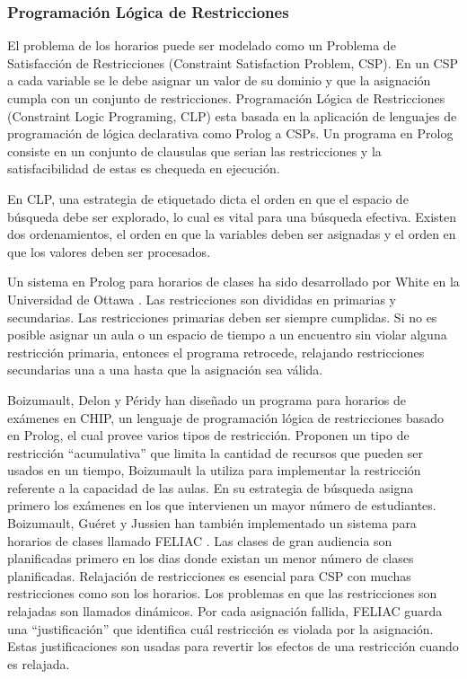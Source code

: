 \subsubsection{Programación Lógica de Restricciones}

El problema de los horarios puede ser modelado como un Problema de Satisfacción de Restricciones (Constraint Satisfaction Problem, CSP). En un CSP a cada variable se le debe asignar un valor de su dominio y que la asignación cumpla con un conjunto de restricciones. Programación Lógica de Restricciones (Constraint Logic Programing, CLP) esta basada en la aplicación de lenguajes de programación de lógica declarativa como Prolog a CSPs. Un programa en Prolog consiste en un conjunto de clausulas que serian las restricciones y la satisfacibilidad de estas es chequeda en ejecución.

En CLP, una estrategia de etiquetado dicta el orden en que el espacio de búsqueda debe ser explorado, lo cual es vital para una búsqueda efectiva. Existen dos ordenamientos, el orden en que la variables deben ser asignadas y el orden en que los valores deben ser procesados.

Un sistema en Prolog para horarios de clases ha sido desarrollado por White en la Universidad de Ottawa \cite{L Kang and GM White, C Cheng and L Kang and N Leung and GM White}. Las restricciones son divididas en primarias y secundarias. Las restricciones primarias deben ser siempre cumplidas. Si no es posible asignar un aula o un espacio de tiempo a un encuentro sin violar alguna restricción primaria, entonces el programa retrocede, relajando restricciones secundarias una a una hasta que la asignación sea válida.

Boizumault, Delon y P\'eridy han diseñado un programa para horarios de exámenes \cite{P Boizumault and Y Delon and L Peridy} en CHIP, un lenguaje de programación lógica de restricciones basado en Prolog, el cual provee varios tipos de restricción. Proponen un tipo de restricción ``acumulativa'' que limita la cantidad de recursos que pueden ser usados en un tiempo, Boizumault la utiliza para implementar la restricción referente a la capacidad de las aulas. En su estrategia de búsqueda asigna primero los exámenes en los que intervienen un mayor número de estudiantes. Boizumault, Gu\'eret y Jussien han tambi\'en implementado un sistema para horarios de clases llamado FELIAC \cite{P Boizumault and C Gueret and N Jussien, C Gueret and N Jussien and P Boizumault and C Prins}. Las clases de gran audiencia son planificadas primero en los dias donde existan un menor número de clases planificadas. Relajación de restricciones es esencial para CSP con muchas restricciones como son los horarios. Los problemas en que las restricciones son relajadas son llamados dinámicos. Por cada asignación fallida, FELIAC guarda una ``justificación'' que identifica cuál restricción es violada por la asignación. Estas justificaciones son usadas para revertir los efectos de una restricción cuando es relajada.


